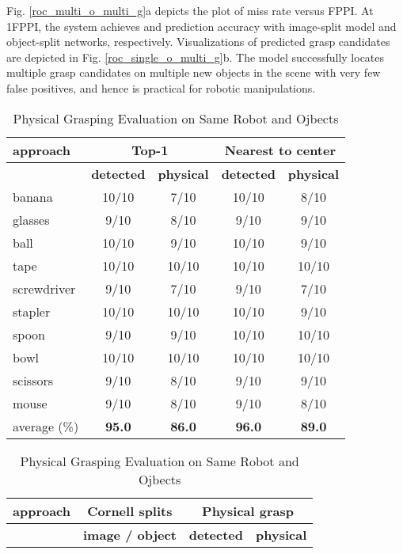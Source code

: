 \documentclass[letterpaper, 10 pt, journal, twoside]{IEEEtran}
\begin{document}
Fig. \ref{roc_multi_o_multi_g}a depicts the plot of miss rate versus
FPPI. At 1FPPI, the system achieves  and  prediction accuracy
with image-split model and object-split networks, respectively. 
Visualizations of predicted grasp candidates are depicted in Fig.
\ref{roc_single_o_multi_g}b.  The model successfully locates multiple grasp
candidates on multiple new objects in the scene with very few false
positives, and hence is practical for robotic manipulations.      



\begin {table}[t]
  \centering
\caption {Physical Grasping Comparison  }
  \small
  \begin{tabular}{ | l | c | c | c | c |}
    \hline
{\bf approach} & \multicolumn{2}{c|}{ \bf{Top-1}} & \multicolumn{2}{c|}{ \bf{Nearest to center}} \\ \hline
                 & \bf{detected} & \bf{physical} & \bf{detected} & \bf{physical} \\ \hline
    
    banana       & 10/10   &  7/10   & 10/10   &  8/10  \\ \hline
    glasses      &  9/10   &  8/10   &  9/10   &  9/10  \\ \hline
    ball         & 10/10   &  9/10   & 10/10   &  9/10  \\ \hline
    tape	         & 10/10   & 10/10   & 10/10   & 10/10  \\ \hline
    screwdriver  &  9/10   &  7/10   &  9/10   &  7/10  \\ \hline
    stapler      & 10/10   & 10/10   & 10/10   &  9/10  \\ \hline
    spoon        &  9/10   &  9/10   & 10/10   & 10/10  \\ \hline
    bowl         & 10/10   & 10/10   & 10/10   & 10/10  \\ \hline
    scissors     &  9/10   &  8/10   &  9/10   &  9/10  \\ \hline
    mouse        &  9/10   &  8/10   &  9/10   &  8/10  \\ \hline \hline
    average (\%) &\bf{95.0}&\bf{86.0}&\bf{96.0}&\bf{89.0}\\

    \hline
  \end{tabular}


  \vspace*{2.00ex}
\caption {Physical Grasping Evaluation on Same Robot and Ojbects  }
  \small
  \begin{tabular}{ | l | c | c | c |}
    \hline
{\bf approach} &  \bf{Cornell splits} & \multicolumn{2}{c|}{ \bf{Physical grasp}} \\ \hline
                 & \bf{image / object} & \bf{detected} & \bf{physical} \\ \hline
    

\end{tabular}
\end{table}
\end{document}
